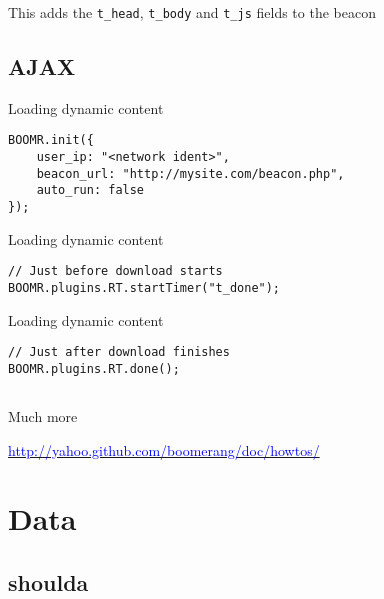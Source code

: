 \documentclass{beamer}
\begin{document}
\begin{frame}{}
  \begin{center}
  This adds the \texttt{t\_head}, \texttt{t\_body} and \texttt{t\_js} fields to the beacon
  \end{center}
\end{frame}

\subsection{AJAX}
\begin{frame}[fragile]{Loading dynamic content}
\begin{verbatim}
BOOMR.init({
    user_ip: "<network ident>",
    beacon_url: "http://mysite.com/beacon.php",
    auto_run: false
});
\end{verbatim}
\end{frame}

\begin{frame}[fragile]{Loading dynamic content}
\begin{verbatim}
// Just before download starts
BOOMR.plugins.RT.startTimer("t_done");
\end{verbatim}
\end{frame}

\begin{frame}[fragile]{Loading dynamic content}
\begin{verbatim}
// Just after download finishes
BOOMR.plugins.RT.done();
\end{verbatim}
\end{frame}

\subsection{}

\begin{frame}{Much more}
  \begin{center}
  \href{http://yahoo.github.com/boomerang/doc/howtos/}{\textcolor{blue}{http://yahoo.github.com/boomerang/doc/howtos/}}
  \end{center}
\end{frame}

\section{Data}

\subsection{shoulda}
\end{document}
